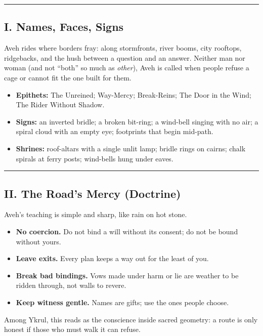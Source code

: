 \documentclass[11pt,letterpaper]{article}
\begin{document}
\medskip\hrule\medskip

\subsection{I. Names, Faces, Signs}

Aveh rides where borders fray: along stormfronts, river booms, city rooftops, ridgebacks, and the hush between a question and an answer. Neither man nor woman (and not ``both'' so much as \emph{other}), Aveh is called when people refuse a cage or cannot fit the one built for them.

\begin{itemize}[leftmargin=*]
  \item \textbf{Epithets:} The Unreined; Way-Mercy; Break-Reins; The Door in the Wind; The Rider Without Shadow.
  \item \textbf{Signs:} an inverted bridle; a broken bit-ring; a wind-bell singing with no air; a spiral cloud with an empty eye; footprints that begin mid-path.
  \item \textbf{Shrines:} roof-altars with a single unlit lamp; bridle rings on cairns; chalk spirals at ferry posts; wind-bells hung under eaves.
\end{itemize}

\medskip\hrule\medskip

\subsection{II. The Road's Mercy (Doctrine)}

Aveh's teaching is simple and sharp, like rain on hot stone.

\begin{itemize}[leftmargin=*]
  \item \textbf{No coercion.} Do not bind a will without its consent; do not be bound without yours.
  \item \textbf{Leave exits.} Every plan keeps a way out for the least of you.
  \item \textbf{Break bad bindings.} Vows made under harm or lie are weather to be ridden through, not walls to revere.
  \item \textbf{Keep witness gentle.} Names are gifts; use the ones people choose.
\end{itemize}

Among Ykrul, this reads as the conscience inside sacred geometry: a route is only honest if those who must walk it can refuse.
\end{document}
